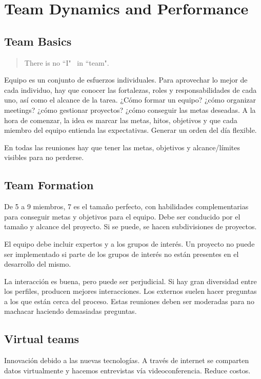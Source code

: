 \documentclass[oneside]{book}
\begin{document}
\chapter{Team Dynamics and Performance}
\section{Team Basics}

\begin{quote}
There is no ``I" \ in ``team".
\end{quote} Equipo es un conjunto de esfuerzos individuales. Para aprovechar lo mejor de cada individuo, hay que conocer las fortalezas, roles y responsabilidades de cada uno, así como el alcance de la tarea. ¿Cómo formar un equipo? ¿cómo organizar meetings? ¿cómo gestionar proyectos? ¿cómo conseguir las metas deseadas. A la hora de comenzar, la idea es marcar las metas, hitos, objetivos y que cada miembro del equipo entienda las expectativas. Generar un orden del día flexible.

En todas las reuniones hay que tener las metas, objetivos y alcance/límites visibles para no perderse.

\section{Team Formation}

De 5 a 9 miembros, 7 es el tamaño perfecto, con habilidades complementarias para conseguir metas y objetivos para el equipo. Debe ser conducido por el tamaño y alcance del proyecto. Si se puede, se hacen subdivisiones de proyectos.

El equipo debe incluir expertos y a los grupos de interés. Un proyecto no puede ser implementado si parte de los grupos de interés no están presentes en el desarrollo del mismo.

La interacción es buena, pero puede ser perjudicial. Si hay gran diversidad entre los perfiles, producen mejores interacciones. Los externos suelen hacer preguntas a los que están cerca del proceso. Estas reuniones deben ser moderadas para no machacar haciendo demasiadas preguntas.

\section{Virtual teams}

Innovación debido a las nuevas tecnologías. A través de internet se comparten datos virtualmente y hacemos entrevistas vía videoconferencia. Reduce costos.
\end{document}
